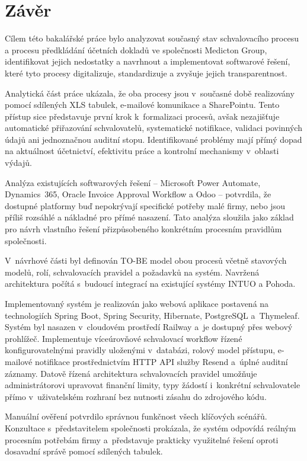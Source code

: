 \chapter{Závěr}

Cílem této bakalářské práce bylo analyzovat současný stav schvalovacího procesu
a procesu předkládání účetních dokladů ve společnosti Medicton Group, identifikovat
jejich nedostatky a navrhnout a implementovat softwarové řešení, které tyto procesy
digitalizuje, standardizuje a zvyšuje jejich transparentnost.

Analytická část práce ukázala, že oba procesy jsou v~současné době realizovány
pomocí sdílených XLS tabulek, e-mailové komunikace a SharePointu. Tento přístup
sice představuje první krok k~formalizaci procesů, avšak nezajišťuje automatické
přiřazování schvalovatelů, systematické notifikace, validaci povinných údajů ani
jednoznačnou auditní stopu. Identifikované problémy mají přímý dopad na aktuálnost
účetnictví, efektivitu práce a kontrolní mechanismy v~oblasti výdajů.

Analýza existujících softwarových řešení -- Microsoft Power Automate, Dynamics~365,
Oracle Invoice Approval Workflow a Odoo -- potvrdila, že dostupné platformy
buď nepokrývají specifické potřeby malé firmy, nebo jsou příliš rozsáhlé
a nákladné pro přímé nasazení. Tato analýza sloužila jako základ pro návrh
vlastního řešení přizpůsobeného konkrétním procesním pravidlům společnosti.

V~návrhové části byl definován TO-BE model obou procesů včetně stavových modelů,
rolí, schvalovacích pravidel a požadavků na systém. Navržená architektura
počítá s~budoucí integrací na existující systémy INTUO a Pohoda.

Implementovaný systém je realizován jako webová aplikace postavená na technologiích
Spring Boot, Spring Security, Hibernate, PostgreSQL a~Thymeleaf. Systém byl
nasazen v~cloudovém prostředí Railway a~je dostupný přes webový prohlížeč.
Implementuje víceúrovňové schvalovací workflow řízené konfigurovatelnými pravidly
uloženými v~databázi, rolový model přístupu, e-mailové notifikace prostřednictvím
HTTP API služby Resend a~úplné auditní záznamy. Datově řízená architektura
schvalovacích pravidel umožňuje administrátorovi upravovat finanční limity,
typy žádostí i~konkrétní schvalovatele přímo v~uživatelském rozhraní bez nutnosti
zásahu do zdrojového kódu.

Manuální ověření potvrdilo správnou funkčnost všech klíčových scénářů. Konzultace
s~představitelem společnosti prokázala, že systém odpovídá reálným procesním
potřebám firmy a~představuje prakticky využitelné řešení oproti dosavadní
správě pomocí sdílených tabulek.

